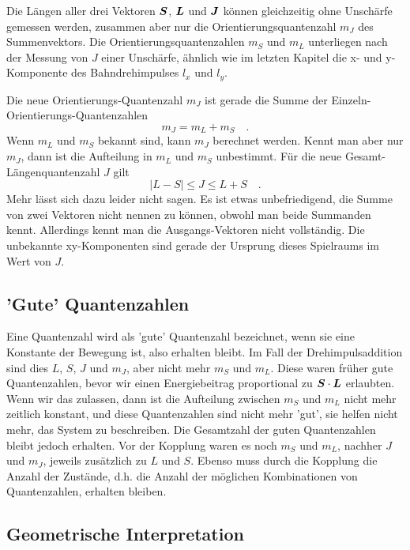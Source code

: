 Die Längen aller drei Vektoren $\boldsymbol{S}$, $\boldsymbol{L}$ und $\boldsymbol{J}$ können gleichzeitig ohne Unschärfe gemessen werden, zusammen aber nur die Orientierungsquantenzahl $m_J$ des Summenvektors. Die Orientierungsquantenzahlen $m_S$ und $m_L$ unterliegen nach der Messung von $J$ einer Unschärfe, ähnlich wie im letzten Kapitel die x- und y-Komponente des Bahndrehimpulses $l_x$ und $l_y$.

Die neue Orientierungs-Quantenzahl $m_J$ ist gerade die Summe der Einzeln-Orientierungs-Quantenzahlen
\begin{equation}
 m_J  = m_L + m_S \quad .
\end{equation}
Wenn $m_L$ und $m_S$ bekannt sind, kann $m_J$ berechnet werden. Kennt man aber nur $m_J$, dann ist die Aufteilung in $m_L$ und $m_S$ unbestimmt.  Für die neue Gesamt-Längenquantenzahl $J$ gilt
\begin{equation}
 | L - S | \le J \le  L + S \quad .
\end{equation}
Mehr lässt sich dazu leider nicht sagen. Es ist etwas unbefriedigend, die Summe von zwei Vektoren nicht nennen zu können, obwohl man beide Summanden kennt. Allerdings kennt man die Ausgangs-Vektoren nicht vollständig. Die unbekannte xy-Komponenten sind gerade der Ursprung dieses Spielraums im Wert von $J$.

\subsection{'Gute' Quantenzahlen}

Eine Quantenzahl wird als 'gute' Quantenzahl bezeichnet, wenn sie eine Konstante der Bewegung ist, also erhalten bleibt. Im Fall der Drehimpulsaddition sind dies $L$, $S$, $J$ und $m_J$, aber nicht mehr $m_S$ und $m_L$. Diese waren früher gute Quantenzahlen, bevor wir einen Energiebeitrag proportional zu $\boldsymbol{S} \cdot \boldsymbol{L}$ erlaubten. Wenn wir das zulassen, dann ist die Aufteilung zwischen $m_S$ und $m_L$ nicht mehr zeitlich konstant, und diese Quantenzahlen sind nicht mehr 'gut', sie helfen nicht mehr, das System zu beschreiben. Die Gesamtzahl der guten Quantenzahlen bleibt jedoch erhalten. Vor der Kopplung waren es noch $m_S$ und $m_L$, nachher $J$ und $m_J$, jeweils zusätzlich zu $L$ und $S$. Ebenso muss durch die Kopplung die Anzahl der Zustände, d.h. die Anzahl der möglichen Kombinationen von Quantenzahlen, erhalten bleiben.



\subsection{Geometrische Interpretation}


